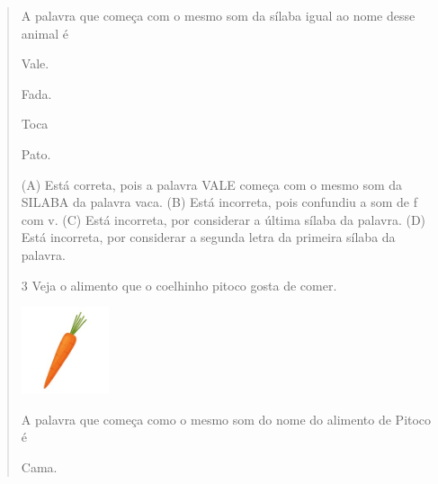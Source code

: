 \begin{verse}

A palavra que começa com o mesmo som da sílaba igual ao nome desse animal é

\begin{minipage}{.5\textwidth}
\begin{escolha}
\item Vale.

\item Fada.

\item Toca

\item Pato.
\end{escolha}
\end{minipage}

(A) Está correta, pois a palavra VALE começa com o mesmo som da SILABA da palavra vaca.
(B) Está incorreta, pois confundiu a som de f com v.
(C) Está incorreta, por considerar a última sílaba da palavra.
(D) Está incorreta, por considerar a segunda letra da primeira sílaba da palavra.

\num{3} Veja o alimento que o coelhinho pitoco gosta de comer.

\includegraphics[width=1.01111in,height=1.01111in]{media/image149.jpeg}


A palavra que começa como o mesmo som do nome do alimento de Pitoco é

\begin{minipage}{.5\textwidth}
\begin{escolha}
\item Cama.


\end{escolha}
\end{minipage}
\end{verse}
